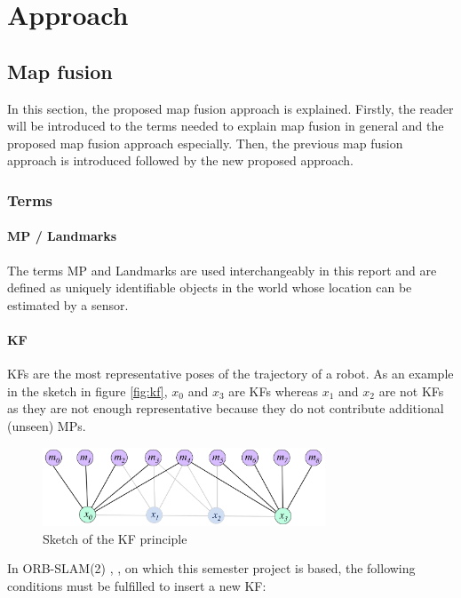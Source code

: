\chapter{Approach}
\label{chap:approach}

\section{Map fusion}
\label{sec:mapmerging}
In this section, the proposed map fusion approach is explained. Firstly, the reader will be introduced to the terms needed to explain map fusion in general and the proposed map fusion approach especially. Then, the previous map fusion approach is introduced followed by the new proposed approach.

\subsection{Terms}

\subsubsection{\acf{MP} / Landmarks}
The terms \acf{MP} and Landmarks are used interchangeably in this report and are defined as uniquely identifiable objects in the world whose location can be estimated by a sensor.

\subsubsection{\acf{KF}}
\acfp{KF} are the most representative poses of the trajectory of a robot. As an example in the sketch in figure \autoref{fig:kf}, $x_0$ and $x_3$ are \acp{KF} whereas $x_1$ and $x_2$ are not \acp{KF} as they are not enough representative because they do not contribute additional (unseen) \acp{MP}.

\begin{figure}[H]
   \centering
   \includegraphics[width=0.75\textwidth]{images/keyframes}
   \caption{Sketch of the \ac{KF} principle}
   \label{fig:kf}
\end{figure}

In ORB-SLAM(2) \cite{Mur-Artal2015}, \cite{Mur-Artal2016}, on which this semester project is based, the following conditions must be fulfilled to insert a new \ac{KF}:

